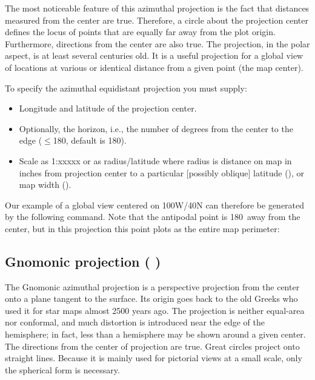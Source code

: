 The most noticeable feature of this azimuthal projection is the
fact that distances measured from the center are true.  Therefore,
a circle about the projection center defines the locus of points
that are equally far away from the plot origin.  Furthermore,
directions from the center are also true.  The projection, in
the polar aspect, is at least several centuries old.  It is a
useful projection for a global view of locations at various or
identical distance from a given point (the map center).

To specify the azimuthal equidistant projection you must supply:

\begin{itemize}
\item Longitude and latitude of the projection center.
\item Optionally, the horizon, i.e., the number of degrees from the center to the edge ($\le$180\DS, default is 180\DS).
\item Scale as 1:xxxxx or as radius/latitude where
radius is distance on map in inches from projection center to
a particular [possibly oblique] latitude (), or map
width ().
\end{itemize}

Our example of a global view centered on 100\DS W/40\DS N
can therefore be generated by the following 
command.  Note that the antipodal point is 180\DS\ away from
the center, but in this projection this point plots as the
entire map perimeter:




\subsection{Gnomonic projection ( )}


The Gnomonic azimuthal projection is a perspective projection
from the center onto a plane tangent to the surface.  Its origin
goes back to the old Greeks who used it for star maps almost 2500
years ago.  The projection is neither equal-area nor conformal,
and much distortion is introduced near the edge of the hemisphere;
in fact, less than a hemisphere may be shown around a given center.
The directions from the center of projection are true.  Great circles
project onto straight lines. Because it is mainly used for pictorial
views at a small scale, only the spherical form is necessary.

